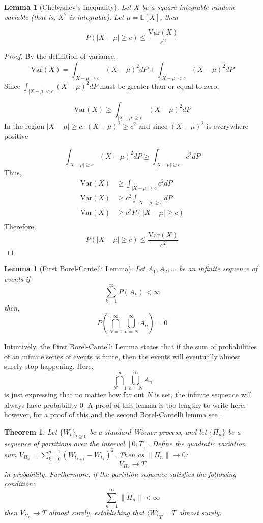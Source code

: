 \documentclass[12pt]{article}
\theoremstyle{definition}
\theoremstyle{plain}
\newtheorem{theorem}{Theorem}[section]
\newtheorem{lemma}[definition]{Lemma}
\theoremstyle{remark}
\begin{document}
\begin{lemma}[Chebyshev's Inequality]
Let $X$ be a square integrable random variable (that is, $X^2$ is integrable).  Let $\mu = \mathbb{E}[X]$, then

\[
P(|X-\mu|\geq c)\leq \frac{\mathrm{Var}(X)}{c^2}
\]
\end{lemma}

\begin{proof}
By the definition of variance,
\[
\mathrm{Var}(X) = \int_{|X-\mu|\geq c} (X-\mu)^2 dP + \int_{|X-\mu| < c} (X-\mu)^2 dP 
\]
  Since $\int_{|X-\mu| < c} (X-\mu)^2dP$ must be greater than or equal to zero,

\[
\mathrm{Var}(X) \geq \int_{|X-\mu|\geq c} (X-\mu)^2dP 
\]
In the region $|X-\mu|\geq c$, $(X-\mu)^2 \geq c^2$ and since $(X-\mu)^2$ is everywhere positive 

\[
\int_{|X-\mu|\geq c} (X-\mu)^2dP \geq \int_{|X-\mu|\geq c} c^2dP
\]
Thus,
\begin{align*}
   \mathrm{Var}(X) &\geq \int_{|X-\mu|\geq c} c^2dP \\
   \mathrm{Var}(X) &\geq c^2\int_{|X-\mu|\geq c} dP \\
    \mathrm{Var}(X) &\geq c^2 P(|X-\mu| \geq c) \\
\end{align*}
Therefore,
\[
    P(|X-\mu| \geq c) \leq \frac{\mathrm{Var}(X)}{c^2}
\]

\end{proof}

\begin{lemma}[First Borel-Cantelli Lemma]
Let $A_1,A_2,...$ be an infinite sequence of events if
\[
\sum_{k=1}^\infty P(A_k) < \infty 
\]
then,
\[
P \left( \bigcap_{N=1}^\infty \bigcup_{n=N}^\infty A_n \right) = 0
\]
\end{lemma}

Intuitively, the First Borel-Cantelli Lemma states that if the sum of probabilities of an infinite series of events is finite, then the events will eventually almost surely stop happening.  Here, \[\bigcap_{N=1}^\infty \bigcup_{n=N}^\infty A_n\]
is just expressing that no matter how far out $N$ is set, the infinite sequence will always have probability $0$.  A proof of this lemma is too lengthy to write here; however, for a proof of this and the second Borel-Cantelli lemma see \cite{BorelCantelli}.

\begin{theorem}
Let $\{W_t\}_{t \geq 0}$ be a standard Wiener process, and let $\{\Pi_n\}$ be a sequence of partitions over the interval $[0,T]$. Define the quadratic variation sum $V_{\Pi_n} = \sum_{k=0}^{n-1} (W_{t_{k+1}} - W_{t_k})^2$. Then as $\|\Pi_n\| \to 0$:
\[
V_{\Pi_n} \to T
\]
in probability. Furthermore, if the partition sequence satisfies the following condition:
\[
\sum_{n=1}^\infty \|\Pi_n\| < \infty
\]
then $V_{\Pi_n} \to T$ almost surely, establishing that $\langle W \rangle_T = T$ almost surely.
\end{theorem}
\end{document}
